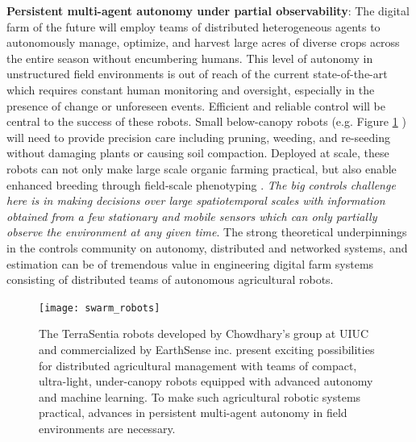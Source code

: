 \textbf{Persistent multi-agent autonomy under partial observability}:  The digital farm of the future will employ teams of distributed heterogeneous agents to autonomously manage, optimize, and harvest large acres of diverse crops across the entire season without encumbering humans. This level of autonomy in unstructured field environments is out of reach of the current state-of-the-art which requires constant human monitoring and oversight, especially in the presence of change or unforeseen events. Efficient and reliable control will be central to the success of these robots. Small below-canopy robots (e.g. Figure \ref{fig:terrasentia} \cite{kayacan2018embedded}) will need to provide precision care including pruning, weeding, and re-seeding without damaging plants or causing soil compaction. Deployed at scale, these robots can not only make large scale organic farming practical, but also enable enhanced breeding through  field-scale phenotyping \cite{kayacan2018embedded,mueller2017robotanist,virlet2017field}. \textit{The big controls challenge here is in making decisions over large spatiotemporal scales with information obtained from a few stationary and mobile sensors which can only partially observe the environment at any given time}. The strong theoretical underpinnings in the controls community on autonomy, distributed and networked systems, and estimation can be of tremendous value in engineering digital farm systems consisting of distributed  teams of autonomous agricultural robots.  %

\begin{figure}
\texttt{[image: swarm\_robots]}
\caption{The TerraSentia robots developed by Chowdhary's group at UIUC and commercialized by EarthSense inc. present exciting possibilities for distributed agricultural management with teams of compact, ultra-light, under-canopy robots equipped with advanced autonomy and machine learning. To make such agricultural robotic systems practical, advances in persistent multi-agent autonomy in field environments are necessary.}
\label{fig:terrasentia}
\end{figure}



